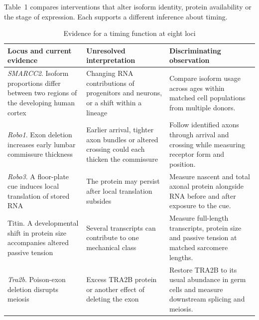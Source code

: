 \documentclass[11pt,a4paper]{article}
\begin{document}
Table~1 compares interventions that alter isoform identity, protein availability or the stage of expression. Each supports a different inference about timing.

\begin{table}[htbp]

\caption{Evidence for a timing function at eight loci}

\small

\begin{tabularx}{\textwidth}{@{}*{3}{>{\raggedright\arraybackslash}X}@{}}\toprule

\textbf{Locus and current evidence} & \textbf{Unresolved interpretation} & \textbf{Discriminating observation}\\\midrule

\textit{SMARCC2}. Isoform proportions differ between two regions of the developing human cortex \cite{Patowary2024} & Changing RNA contributions of progenitors and neurons, or a shift within a lineage & Compare isoform usage across ages within matched cell populations from multiple donors.\\

\addlinespace[9pt]

\textit{Robo1}. Exon deletion increases early lumbar commissure thickness \cite{Johnson2019} & Earlier arrival, tighter axon bundles or altered crossing could each thicken the commissure & Follow identified axons through arrival and crossing while measuring receptor form and position.\\

\addlinespace[9pt]

\textit{Robo3}. A floor-plate cue induces local translation of stored RNA \cite{Colak2013} & The protein may persist after local translation subsides & Measure nascent and total axonal protein alongside RNA before and after exposure to the cue.\\

\addlinespace[9pt]

Titin. A developmental shift in protein size accompanies altered passive tension \cite{Opitz2004} & Several transcripts can contribute to one mechanical class & Measure full-length transcripts, protein size and passive tension at matched sarcomere lengths.\\

\addlinespace[9pt]

\textit{Tra2b}. Poison-exon deletion disrupts meiosis \cite{Dalgliesh2025} & Excess TRA2B protein or another effect of deleting the exon & Restore TRA2B to its usual abundance in germ cells and measure downstream splicing and meiosis.\\


\end{tabularx}
\end{table}
\end{document}
